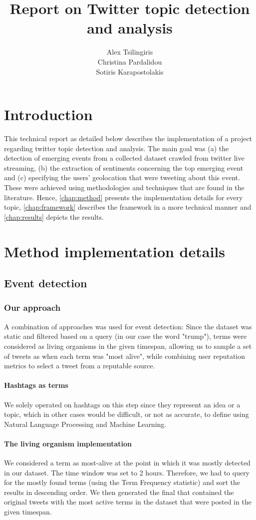 \documentclass[12pt,svgnames]{report}
\title{\color{mycolor}Report on Twitter topic detection and analysis}
\author{
Alex Tsilingiris \\
Christina Pardalidou \\
Sotiris Karapostolakis \\
}
\begin{document}
\maketitle
\begingroup
\color{mycolor}
\tableofcontents
\endgroup
\chapter{Introduction}
This technical report as detailed below describes the implementation of a project regarding twitter topic detection and analysis. The main goal was (a) the detection of emerging events from a collected dataset crawled from twitter live streaming, (b) the extraction of sentiments concerning the top emerging event and (c) specifying the users' geolocation  that were tweeting about this event. These were achieved using methodologies and techniques that are found in the literature. Hence,  \autoref{chap:method} presents the implementation details for every topic, \autoref{chap:framework} describes the framework in a more technical manner and \autoref{chap:results} depicts the results.
\chapter{Method implementation details}
\label{chap:method}
\section*{Event detection}
\subsection*{Our approach}
A combination of approaches was used for event detection: Since the dataset was static and filtered based on a query (in our case the word "trump"), terms were considered as living organisms in the given timespan, allowing us to sample a set of tweets as when each term was "most alive", while combining user reputation metrics to select a tweet from a reputable source.
\subsubsection*{Hashtags as terms}
We solely operated on hashtags on this step since they represent an idea or a topic, which in other cases would be difficult, or not as accurate, to define using Natural Language Processing and Machine Learning.
\subsubsection*{The living organism implementation}
We considered a term as most-alive at the point in which it was mostly detected in our dataset. The time window was set to 2 hours. Therefore, we had to query for the mostly found terms (using the Term Frequency statistic) and sort the results in descending order. We then generated the final that contained the original tweets with the most active terms in the dataset that were posted in the given timespan.
\end{document}
